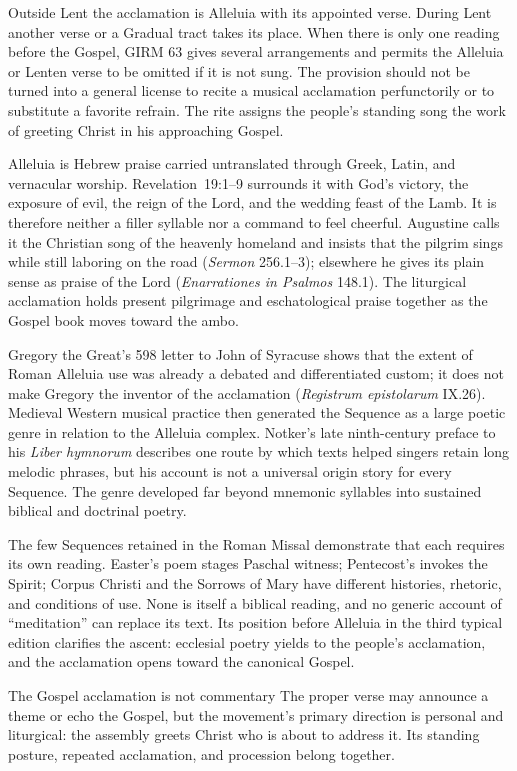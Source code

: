 Outside Lent the acclamation is Alleluia with its appointed verse. During Lent another verse or a Gradual tract takes its place. When there is only one reading before the Gospel, GIRM 63 gives several arrangements and permits the Alleluia or Lenten verse to be omitted if it is not sung. The provision should not be turned into a general license to recite a musical acclamation perfunctorily or to substitute a favorite refrain. The rite assigns the people's standing song the work of greeting Christ in his approaching Gospel.

Alleluia is Hebrew praise carried untranslated through Greek, Latin, and vernacular worship. Revelation~19:1--9 surrounds it with God's victory, the exposure of evil, the reign of the Lord, and the wedding feast of the Lamb. It is therefore neither a filler syllable nor a command to feel cheerful. Augustine calls it the Christian song of the heavenly homeland and insists that the pilgrim sings while still laboring on the road (\emph{Sermon} 256.1--3); elsewhere he gives its plain sense as praise of the Lord (\emph{Enarrationes in Psalmos} 148.1). The liturgical acclamation holds present pilgrimage and eschatological praise together as the Gospel book moves toward the ambo.

Gregory the Great's 598 letter to John of Syracuse shows that the extent of Roman Alleluia use was already a debated and differentiated custom; it does not make Gregory the inventor of the acclamation (\emph{Registrum epistolarum} IX.26). Medieval Western musical practice then generated the Sequence as a large poetic genre in relation to the Alleluia complex. Notker's late ninth-century preface to his \emph{Liber hymnorum} describes one route by which texts helped singers retain long melodic phrases, but his account is not a universal origin story for every Sequence. The genre developed far beyond mnemonic syllables into sustained biblical and doctrinal poetry.

The few Sequences retained in the Roman Missal demonstrate that each requires its own reading. Easter's poem stages Paschal witness; Pentecost's invokes the Spirit; Corpus Christi and the Sorrows of Mary have different histories, rhetoric, and conditions of use. None is itself a biblical reading, and no generic account of ``meditation'' can replace its text. Its position before Alleluia in the third typical edition clarifies the ascent: ecclesial poetry yields to the people's acclamation, and the acclamation opens toward the canonical Gospel.

\begin{studybox}{The Gospel acclamation is not commentary}
The proper verse may announce a theme or echo the Gospel, but the movement's primary direction is personal and liturgical: the assembly greets Christ who is about to address it. Its standing posture, repeated acclamation, and procession belong together.
\end{studybox}

